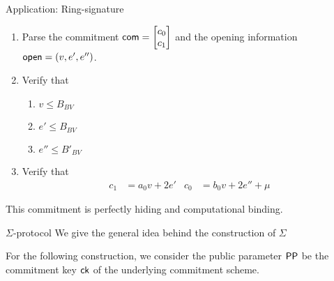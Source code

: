\begin{section}{Application: Ring-signature}
\begin{description}
\begin{enumerate}
      \item Parse the commitment $\mathsf{com} = \begin{bmatrix} c_0 \\ c_1 \end{bmatrix}$
      and the opening information $\mathsf{open} = (v, e', e'')$.
      \item Verify that
      \begin{enumerate}
        \item $v \leq B_{BV}$
        \item $e' \leq B_{BV}$
        \item $e'' \leq B'_{BV}$
      \end{enumerate}
      \item Verify that
      \begin{align*}
        c_1 &= a_0 v + 2e' & c_0 &= b_0v +2 e'' + \mu
      \end{align*}
    \end{enumerate}
  \end{description}

  This commitment is perfectly hiding and computational binding.

  \begin{subsection}{$\Sigma$-protocol}
    We give the general idea behind the construction of $\Sigma$


    For the following construction, we consider the public parameter ${\mathsf{PP}}$ be the commitment key $\mathsf{ck}$ of the underlying commitment scheme.
    \begin{description}



\end{description}
\end{subsection}
\end{section}
